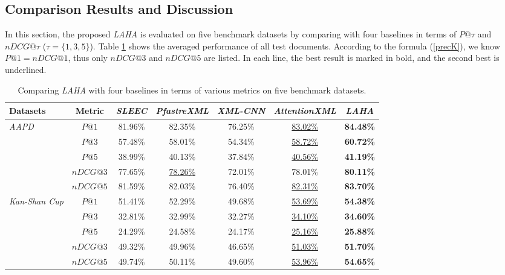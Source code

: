 \documentclass[runningheads]{llncs}
\begin{document}
\vspace{-4mm}
\subsection{Comparison Results and Discussion}
In this section, the proposed \textit{LAHA} is evaluated on five benchmark datasets by comparing with four baselines in terms of $P@\tau$ and $nDCG@\tau$ ($\tau=\{1,3,5\}$). Table \ref{table2} shows the averaged performance of all test documents. According to the formula (\ref{precK}), we know $P@1=nDCG@1$, thus only $nDCG@3$ and $nDCG@5$ are listed. In each line, the best result is marked in bold, and the second best is underlined.




\begin{table}[t]\centering
	\small
	\caption{Comparing \textit{LAHA} with four baselines in terms of various metrics on five benchmark datasets.}\label{table2}
	\begin{tabular}{l|c|c|c|c|c|c}
		\hline
Datasets  &Metric &\textit{SLEEC} & \textit{PfastreXML} &\textit{XML-CNN} &\textit{AttentionXML}     & \textit{LAHA}	  \\ \hline
		\multirow{5}{*}{\textit{AAPD}}	 &$P@1$ & 81.96\%& 82.35\% &76.25\% & \underline{83.02\%} &  \textbf{84.48\%} 	  \\ 
		& $P@3$ &57.48\% & 58.01\% & 54.34\%& \underline{58.72\%} &  \textbf{60.72\%} 	 \\
		& $P@5$ & 38.99\%& 40.13\% & 37.84\%& \underline{40.56\%} &  \textbf{41.19\%} 	  \\ \cline{2-7}
		& $nDCG@3$ & 77.65\%& \underline{78.26\%} & 72.01\%& 78.01\% & \textbf{80.11\%} 	 \\
		& $nDCG@5$ & 81.59\%& 82.03\% &76.40\% & \underline{82.31\%} & \textbf{83.70\%} 	  \\ \hline \hline
		\multirow{5}{*}{\textit{Kan-Shan Cup}}	 &$P@1$ & 51.41\%& 52.29\% &49.68\%& \underline{53.69\%} 	& \textbf{54.38\%} 	  \\ 
		& $P@3$ & 32.81\%& 32.99\% & 32.27\%& \underline{34.10\%} 	& \textbf{34.60\%} 	 \\
		& $P@5$ & 24.29\%& 24.58\% &24.17\% & \underline{25.16\%} & 	 \textbf{25.88\%} 	  \\ \cline{2-7}
		& $nDCG@3$ & 49.32\% & 49.96\% & 46.65\%& \underline{51.03\%} & \textbf{51.70\%} 	 \\
		& $nDCG@5$ & 49.74\%& 50.11\% &49.60\% & \underline{53.96\%} &  \textbf{54.65\%} 	  \\ \hline \hline

\end{tabular}
\end{table}
\end{document}
